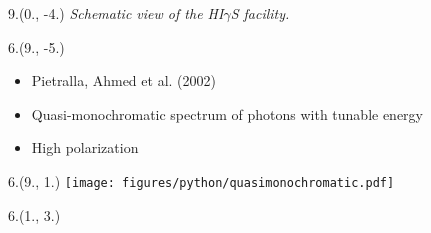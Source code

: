 



\begin{textblock}{9.}(0., -4.)
    \textit{Schematic view of the HI$\gamma$S facility.}
\end{textblock}

\begin{textblock}{6.}(9., -5.)
    \begin{itemize}
        \item Pietralla, Ahmed et al. (2002)
        \item Quasi-monochromatic spectrum of photons with tunable energy
        \item High polarization
    \end{itemize}
\end{textblock}

\def \SPECTRUMX {9.}
\def \SPECTRUMY {1.}

\begin{textblock}{6.}(\SPECTRUMX, \SPECTRUMY)
    \texttt{[image: figures/python/quasimonochromatic.pdf]}
\end{textblock}

\begin{textblock}{6.}(1., 3.)
\end{textblock}